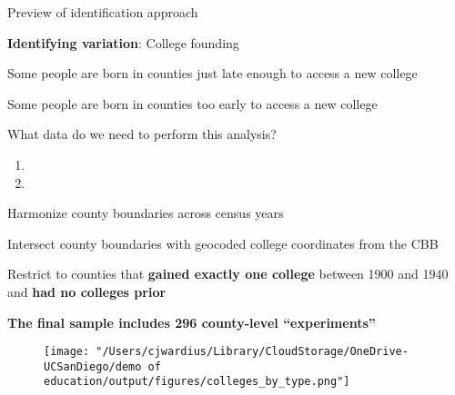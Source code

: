 \documentclass[notes,11pt, aspectratio=169]{beamer}
\newenvironment{wideitemize}{\itemize\addtolength{\itemsep}{10pt}}{\enditemize}
\begin{document}
\begin{frame}{Preview of identification approach}
  \begin{wideitemize}
    \item \textbf{Identifying variation}: College founding
    \item Some people are born in counties just late enough to access a new college
    \item Some people are born in counties too early to access a new college
  \end{wideitemize}
\end{frame}

\begin{frame}{What data do we need to perform this analysis?}
  \begin{enumerate}
    \item {}
    \vspace{2cm}
    \item {}
  \end{enumerate}
\end{frame}

\begin{frame}[label=isolating]{\color{orange}{Identifying counties that experienced a college expansion}}
  \begin{wideitemize}
    \item Harmonize county boundaries across census years
    \item Intersect county boundaries with geocoded college coordinates from the CBB
    \item Restrict to counties that \textbf{gained exactly one college} between 1900 and 1940 and \textbf{had no colleges prior}
    \item \textbf{The final sample includes 296 county-level ``experiments''}
  \end{wideitemize}
  \vspace{1em}
  \centering
  \hyperlink{spatialstability}{} \quad
  \hyperlink{countycrosswalk}{}
\end{frame}

\begin{frame}{\color{orange}{Heterogeneity in college type}}
 \begin{figure}
    \texttt{[image: "/Users/cjwardius/Library/CloudStorage/OneDrive-UCSanDiego/demo of education/output/figures/colleges\_by\_type.png"]}
  \end{figure}
\end{frame}
\end{document}
